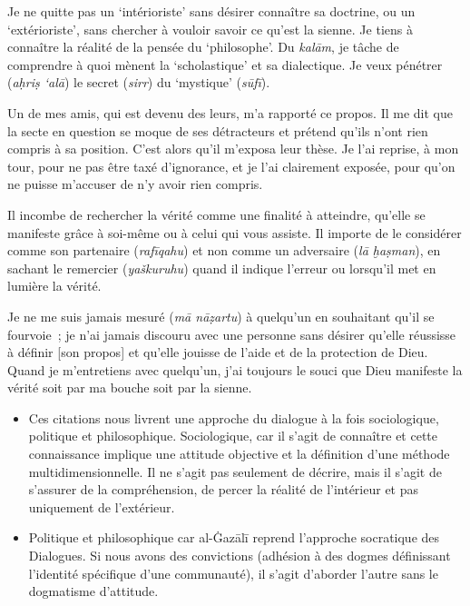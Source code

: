 Je ne quitte pas un `intérioriste' sans désirer connaître sa doctrine,
ou un `extérioriste', sans chercher à vouloir savoir ce qu'est la
sienne. Je tiens à connaître la réalité de la pensée du `philosophe'. Du
\emph{kalām}, je tâche de comprendre à quoi mènent la `scholastique' et
sa dialectique. Je veux pénétrer (\emph{aḥriṣ `alā}) le secret
(\emph{sirr}) du `mystique' (\emph{sūfī}).

Un de mes amis, qui est devenu des leurs, m'a rapporté ce propos. Il me
dit que la secte en question se moque de ses détracteurs et prétend
qu'ils n'ont rien compris à sa position. C'est alors qu'il m'exposa leur
thèse. Je l'ai reprise, à mon tour, pour ne pas être taxé d'ignorance,
et je l'ai clairement exposée, pour qu'on ne puisse m'accuser de n'y
avoir rien compris.

Il incombe de rechercher la vérité comme une finalité à atteindre,
qu'elle se manifeste grâce à soi-même ou à celui qui vous assiste. Il
importe de le considérer comme son partenaire (\emph{rafīqahu}) et non
comme un adversaire (\emph{lā ḫaṣman}), en sachant le remercier
(\emph{yaškuruhu}) quand il indique l'erreur ou lorsqu'il met en lumière
la vérité.

Je ne me suis jamais mesuré (\emph{mā nāẓartu}) à quelqu'un en
souhaitant qu'il se fourvoie~; je n'ai jamais discouru avec une personne
sans désirer qu'elle réussisse à définir {[}son propos{]} et qu'elle
jouisse de l'aide et de la protection de Dieu. Quand je m'entretiens
avec quelqu'un, j'ai toujours le souci que Dieu manifeste la vérité soit
par ma bouche soit par la sienne.

\begin{itemize}
\item
  Ces citations nous livrent une approche du dialogue à la fois
  sociologique, politique et philosophique. Sociologique, car il s'agit
  de connaître et cette connaissance implique une attitude objective et
  la définition d'une méthode multidimensionnelle. Il ne s'agit pas
  seulement de décrire, mais il s'agit de s'assurer de la compréhension,
  de percer la réalité de l'intérieur et pas uniquement de l'extérieur.
\item
  Politique et philosophique car al-Ġazālī reprend l'approche socratique
  des Dialogues. Si nous avons des convictions (adhésion à des dogmes
  définissant l'identité spécifique d'une communauté), il s'agit
  d'aborder l'autre sans le dogmatisme d'attitude.
\end{itemize}

